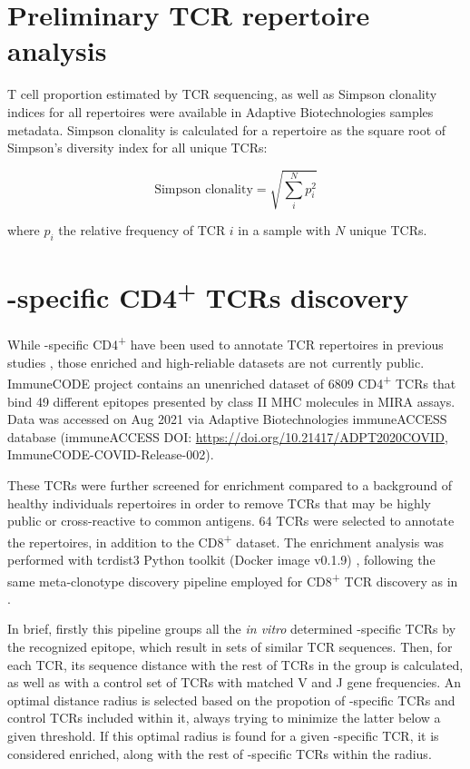 \section*{Preliminary TCR repertoire analysis}


T cell proportion estimated by TCR sequencing, as well as Simpson clonality indices for all repertoires were available in Adaptive Biotechnologies samples metadata. Simpson clonality is calculated for a repertoire as the square root of Simpson’s diversity index for all unique TCRs:


\[ \mbox{Simpson clonality} = \sqrt{\sum_{i}^N p_{i}^2} \]

where $p_{i}$ the relative frequency of TCR $i$ in a sample with $N$ unique TCRs.


\section*{\covid-specific CD4\textsuperscript{+} TCRs discovery}


While \covid-specific CD4\textsuperscript{+} have been used to annotate TCR repertoires in previous studies \citep{janssen, snyderdiagnosis}, those enriched and high-reliable datasets are not currently public. ImmuneCODE\texttrademark{} project contains an unenriched dataset of 6809 CD4\textsuperscript{+} TCRs that bind 49 different \covid{} epitopes presented by class II MHC molecules in MIRA assays. Data was accessed on Aug 2021 via Adaptive Biotechnologies immuneACCESS\textregistered{} database (immuneACCESS\textregistered{} DOI: \url{https://doi.org/10.21417/ADPT2020COVID}, ImmuneCODE-COVID-Release-002).

These TCRs were further screened for enrichment compared to a background of healthy individuals repertoires in order to remove TCRs that may be highly public or cross-reactive to common antigens. 64 TCRs were selected to annotate the repertoires, in addition to the CD8\textsuperscript{+} dataset. The enrichment analysis was performed with tcrdist3 Python toolkit (Docker image v0.1.9) \citep{metaclonotypes, tcrdist}, following the same meta-clonotype discovery pipeline employed for \covid{} CD8\textsuperscript{+} TCR discovery as in \cite{metaclonotypes}.

In brief, firstly this pipeline groups all the \textit{in vitro} determined \covid-specific TCRs by the recognized epitope, which result in sets of similar TCR sequences. Then, for each TCR, its sequence distance with the rest of TCRs in the group is calculated, as well as with a control set of TCRs with matched V and J gene frequencies. An optimal distance radius is selected based on the propotion of \covid-specific TCRs and control TCRs included within it, always trying to minimize the latter below a given threshold. If this optimal radius is found for a given \covid-specific TCR, it is considered enriched, along with the rest of \covid-specific TCRs within the radius.



